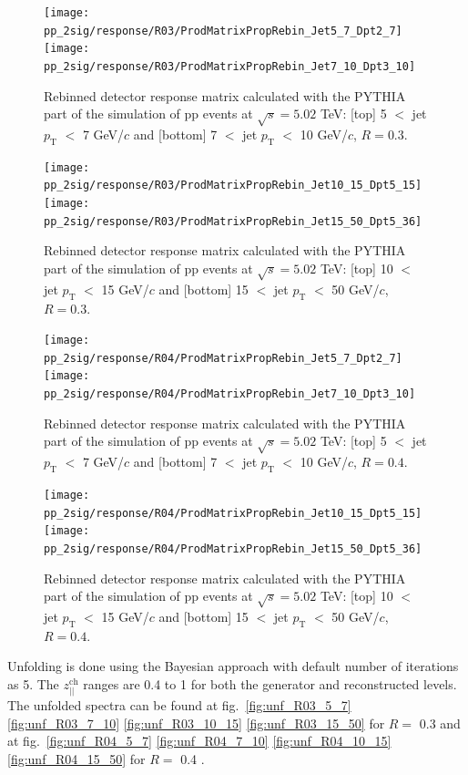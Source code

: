 \begin{figure}[bth]
\centering
\begin{minipage}{.5\textwidth}
\centering
\texttt{[image: pp\_2sig/response/R03/ProdMatrixPropRebin\_Jet5\_7\_Dpt2\_7]}
\texttt{[image: pp\_2sig/response/R03/ProdMatrixPropRebin\_Jet7\_10\_Dpt3\_10]}
\caption{Rebinned detector response matrix calculated with the PYTHIA part of the simulation of pp events at $\sqrt{s} = 5.02$ TeV: [top] 5 $<$ jet $p_\text{T}$ $<$ 7 GeV/$c$ and [bottom] 7 $<$ jet $p_\text{T}$ $<$ 10 GeV/$c$, $R=0.3$.}
\label{fig:detectorResponse_5_7_10_R3}
\end{minipage}%
\begin{minipage}{.5\textwidth}
\centering
\texttt{[image: pp\_2sig/response/R03/ProdMatrixPropRebin\_Jet10\_15\_Dpt5\_15]}
\texttt{[image: pp\_2sig/response/R03/ProdMatrixPropRebin\_Jet15\_50\_Dpt5\_36]}
\caption{Rebinned detector response matrix calculated with the PYTHIA part of the simulation of pp events at $\sqrt{s} = 5.02$ TeV: [top] 10 $<$ jet $p_\text{T}$ $<$ 15 GeV/$c$ and [bottom] 15 $<$ jet $p_\text{T}$ $<$ 50 GeV/$c$, $R=0.3$.}
\label{fig:detectorResponse_10_15_50_R3}
\end{minipage}%
\end{figure}

\begin{figure}[bth]
\centering
\begin{minipage}{.5\textwidth}
\centering
\texttt{[image: pp\_2sig/response/R04/ProdMatrixPropRebin\_Jet5\_7\_Dpt2\_7]}
\texttt{[image: pp\_2sig/response/R04/ProdMatrixPropRebin\_Jet7\_10\_Dpt3\_10]}
\caption{Rebinned detector response matrix calculated with the PYTHIA part of the simulation of pp events at $\sqrt{s} = 5.02$ TeV: [top] 5 $<$ jet $p_\text{T}$ $<$ 7 GeV/$c$ and [bottom] 7 $<$ jet $p_\text{T}$ $<$ 10 GeV/$c$, $R=0.4$.}
\label{fig:detectorResponse_5_7_10_R4}
\end{minipage}%
\begin{minipage}{.5\textwidth}
\centering
\texttt{[image: pp\_2sig/response/R04/ProdMatrixPropRebin\_Jet10\_15\_Dpt5\_15]}
\texttt{[image: pp\_2sig/response/R04/ProdMatrixPropRebin\_Jet15\_50\_Dpt5\_36]}
\caption{Rebinned detector response matrix calculated with the PYTHIA part of the simulation of pp events at $\sqrt{s} = 5.02$ TeV: [top] 10 $<$ jet $p_\text{T}$ $<$ 15 GeV/$c$ and [bottom] 15 $<$ jet $p_\text{T}$ $<$ 50 GeV/$c$, $R=0.4$.}
\label{fig:detectorResponse_10_15_50_R4}
\end{minipage}%
\end{figure}
Unfolding is done using the Bayesian approach with default number of iterations as 5. The $z_{||}^\text{ch}$ ranges are 0.4 to 1 for 
both the generator and reconstructed levels. The unfolded spectra can be found at fig.~\ref{fig:unf_R03_5_7} \ref{fig:unf_R03_7_10} \ref{fig:unf_R03_10_15} \ref{fig:unf_R03_15_50} for $R=$ 0.3 and at fig.~\ref{fig:unf_R04_5_7} \ref{fig:unf_R04_7_10} \ref{fig:unf_R04_10_15} \ref{fig:unf_R04_15_50} for $R=$ 0.4 .


